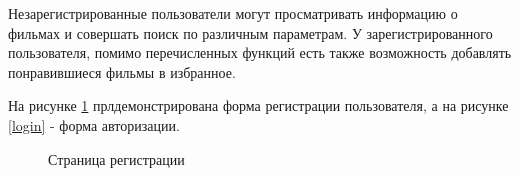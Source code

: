 \documentclass[a4paper, 14pt]{article}
\begin{document}
	Незарегистрированные пользователи могут просматривать информацию о фильмах и совершать поиск по различным параметрам. У зарегистрированного пользователя, помимо перечисленных функций есть также возможность добавлять понравившиеся фильмы в избранное.
	
	На рисунке \ref{reg} прлдемонстрирована форма регистрации пользователя, а на рисунке \ref{login} - форма авторизации.
	
	\begin{figure}[h!]
		\caption{Страница регистрации}
		\label{reg}
	\end{figure}
	
\end{document}
